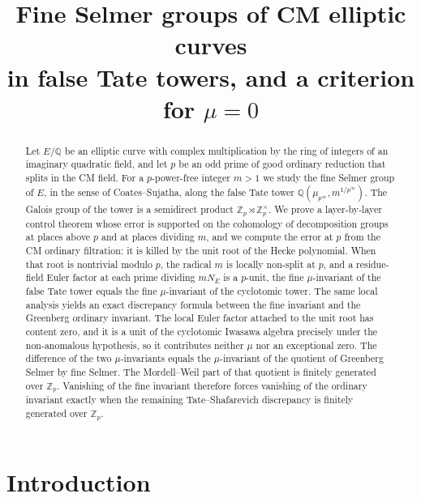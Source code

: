 \documentclass[11pt]{article}
\title{Fine Selmer groups of CM elliptic curves\\
in false Tate towers, and a criterion for \(\mu=0\)}
\author{}
\date{}
\theoremstyle{definition}
\theoremstyle{remark}
\newcommand{\Z}{\mathbb{Z}}
\newcommand{\Q}{\mathbb{Q}}
\begin{document}
\maketitle

\begin{abstract}
Let \(E/\Q\) be an elliptic curve with complex multiplication by the ring of integers of an imaginary quadratic field, and let \(p\) be an odd prime of good ordinary reduction that splits in the CM field. For a \(p\)-power-free integer \(m>1\) we study the fine Selmer group of \(E\), in the sense of Coates--Sujatha, along the false Tate tower \(\Q(\mu_{p^\infty},m^{1/p^\infty})\). The Galois group of the tower is a semidirect product \(\Z_p\rtimes\Z_p^\times\). We prove a layer-by-layer control theorem whose error is supported on the cohomology of decomposition groups at places above \(p\) and at places dividing \(m\), and we compute the error at \(p\) from the CM ordinary filtration: it is killed by the unit root of the Hecke polynomial. When that root is nontrivial modulo \(p\), the radical \(m\) is locally non-split at \(p\), and a residue-field Euler factor at each prime dividing \(mN_E\) is a \(p\)-unit, the fine \(\mu\)-invariant of the false Tate tower equals the fine \(\mu\)-invariant of the cyclotomic tower. The same local analysis yields an exact discrepancy formula between the fine invariant and the Greenberg ordinary invariant. The local Euler factor attached to the unit root has content zero, and it is a unit of the cyclotomic Iwasawa algebra precisely under the non-anomalous hypothesis, so it contributes neither \(\mu\) nor an exceptional zero. The difference of the two \(\mu\)-invariants equals the \(\mu\)-invariant of the quotient of Greenberg Selmer by fine Selmer. The Mordell--Weil part of that quotient is finitely generated over \(\Z_p\). Vanishing of the fine invariant therefore forces vanishing of the ordinary invariant exactly when the remaining Tate--Shafarevich discrepancy is finitely generated over \(\Z_p\).
\end{abstract}

\section{Introduction}
\label{sec:intro}
\end{document}
